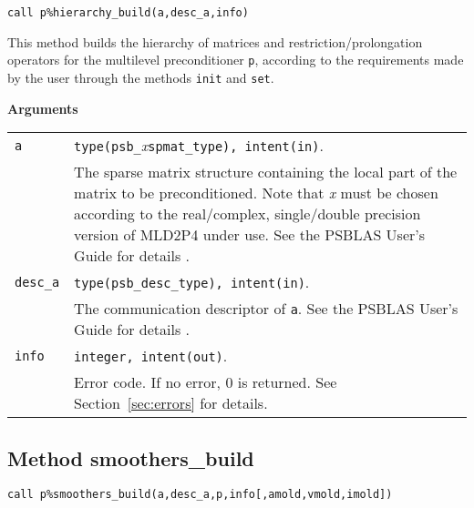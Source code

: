 \begin{center}
\verb|call p%hierarchy_build(a,desc_a,info)|\\
\end{center}

\noindent
This method builds the hierarchy of matrices and restriction/prolongation
operators for the multilevel preconditioner \verb|p|, according to the requirements
made by the user through the methods \verb|init| and \verb|set|.

{\baselineskip\noindent\large\bfseries Arguments} \smallskip

\begin{tabular}{p{1.2cm}p{12cm}}
\verb|a|      & \verb|type(psb_|\emph{x}\verb|spmat_type), intent(in)|. \\
              & The sparse matrix structure containing the local part of the
                matrix to be preconditioned. Note that \emph{x} must be chosen according
                to the real/complex, 
single/double precision version of MLD2P4 under use.
                See the PSBLAS User's Guide for details \cite{PSBLASGUIDE}.\\
\verb|desc_a| & \verb|type(psb_desc_type), intent(in)|. \\
              & The communication descriptor of \verb|a|. See the PSBLAS User's Guide for
                details \cite{PSBLASGUIDE}.\\
\verb|info|   & \verb|integer, intent(out)|.\\
              & Error code. If no error, 0 is returned. See Section~\ref{sec:errors} for details.\\
\end{tabular}


\clearpage

\subsection{Method smoothers\_build\label{sec:smooth_bld}}
 

\begin{center}
\verb|call p%smoothers_build(a,desc_a,p,info[,amold,vmold,imold])|\\
\end{center}

